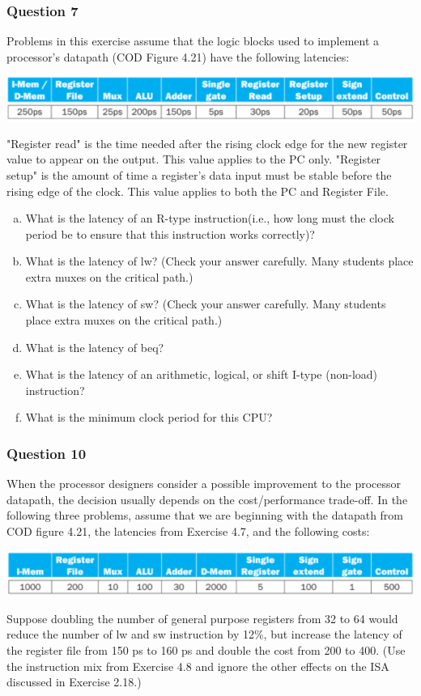 \documentclass[11pt]{article}
\begin{document}
\setcounter{subsubsection}{6}
\subsubsection{Question 7}
Problems in this exercise assume that the logic blocks used to implement a processor's datapath (COD Figure 4.21) have the following latencies:
\begin{center}\includegraphics[scale=0.6]{q7_image}\\\end{center}
"Register read" is the time needed after the rising clock edge for the new register value to appear on the output. This value applies to the PC only. "Register setup" is the amount of time a register's data input must be stable before the rising edge of the clock. This value applies to both the PC and Register File.

\begin{enumerate}[(a)]
    \item What is the latency of an R-type instruction(i.e., how long must the clock period be to ensure that this instruction works correctly)?
    \item What is the latency of lw? (Check your answer carefully. Many students place extra muxes on the critical path.)
    \item What is the latency of sw? (Check your answer carefully. Many students place extra muxes on the critical path.)
    \item What is the latency of beq?
    \item What is the latency of an arithmetic, logical, or shift I-type (non-load) instruction?
    \item What is the minimum clock period for this CPU?
\end{enumerate}

\setcounter{subsubsection}{9}
\subsubsection{Question 10}
When the processor designers consider a possible improvement to the processor datapath, the decision usually depends on the cost/performance trade-off. In the following three problems, assume that we are beginning with the datapath from COD figure 4.21, the latencies from Exercise 4.7, and the following costs:
\begin{center}\includegraphics[scale=0.6]{q10_image}\\\end{center}
Suppose doubling the number of general purpose registers from 32 to 64 would reduce the number of lw and sw instruction by 12\%, but increase the latency of the register file from 150 ps to 160 ps and double the cost from 200 to 400. (Use the instruction mix from Exercise 4.8 and ignore the other effects on the ISA discussed in Exercise 2.18.)
\end{document}
